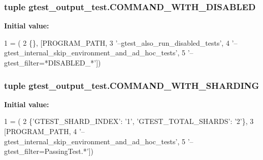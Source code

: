 \hypertarget{namespacegtest__output__test_a0ef963a39dc8e53616ba2dab9f128def}{
\subsubsection[{C\-O\-M\-M\-A\-N\-D\-\_\-\-W\-I\-T\-H\-\_\-\-D\-I\-S\-A\-B\-L\-E\-D}]{\setlength{\rightskip}{0pt plus 5cm}tuple gtest\-\_\-output\-\_\-test.\-C\-O\-M\-M\-A\-N\-D\-\_\-\-W\-I\-T\-H\-\_\-\-D\-I\-S\-A\-B\-L\-E\-D}}\label{namespacegtest__output__test_a0ef963a39dc8e53616ba2dab9f128def}
{\bfseries Initial value\-:}
\begin{DoxyCode}
1 = (
2     \{\}, [PROGRAM\_PATH,
3          \textcolor{stringliteral}{'--gtest\_also\_run\_disabled\_tests'},
4          \textcolor{stringliteral}{'--gtest\_internal\_skip\_environment\_and\_ad\_hoc\_tests'},
5          \textcolor{stringliteral}{'--gtest\_filter=*DISABLED\_*'}])
\end{DoxyCode}
\hypertarget{namespacegtest__output__test_a462eef2a00782001d491b7a38a847bec}{
\subsubsection[{C\-O\-M\-M\-A\-N\-D\-\_\-\-W\-I\-T\-H\-\_\-\-S\-H\-A\-R\-D\-I\-N\-G}]{\setlength{\rightskip}{0pt plus 5cm}tuple gtest\-\_\-output\-\_\-test.\-C\-O\-M\-M\-A\-N\-D\-\_\-\-W\-I\-T\-H\-\_\-\-S\-H\-A\-R\-D\-I\-N\-G}}\label{namespacegtest__output__test_a462eef2a00782001d491b7a38a847bec}
{\bfseries Initial value\-:}
\begin{DoxyCode}
1 = (
2     \{\textcolor{stringliteral}{'GTEST\_SHARD\_INDEX'}: \textcolor{stringliteral}{'1'}, \textcolor{stringliteral}{'GTEST\_TOTAL\_SHARDS'}: \textcolor{stringliteral}{'2'}\},
3     [PROGRAM\_PATH,
4      \textcolor{stringliteral}{'--gtest\_internal\_skip\_environment\_and\_ad\_hoc\_tests'},
5      \textcolor{stringliteral}{'--gtest\_filter=PassingTest.*'}])
\end{DoxyCode}
